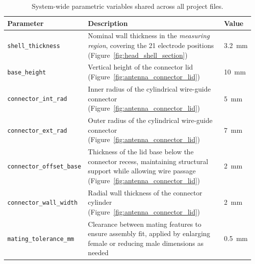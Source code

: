 \begin{table}[h!]
  \centering
  \caption[System-wide CAD parameters]{System-wide parametric variables shared across all project files.}
  \label{tab:system_params}
  \small
  \begin{tabularx}{\textwidth}{l X l}
    \toprule
    \textbf{Parameter} & \textbf{Description} & \textbf{Value} \\
    \midrule
    \texttt{shell\_thickness} & Nominal wall thickness in the \textit{measuring region}, covering the 21 electrode positions (Figure~\ref{fig:head_shell_section}) & 3.2~mm \\[2pt]
    \texttt{base\_height} & Vertical height of the connector lid (Figure~\ref{fig:antenna_connector_lid}) & 10~mm \\[2pt]
    \texttt{connector\_int\_rad} & Inner radius of the cylindrical wire-guide connector (Figure~\ref{fig:antenna_connector_lid}) & 5~mm \\[2pt]
    \texttt{connector\_ext\_rad} & Outer radius of the cylindrical wire-guide connector (Figure~\ref{fig:antenna_connector_lid}) & 7~mm \\[2pt]
    \texttt{connector\_offset\_base} & Thickness of the lid base below the connector recess, maintaining structural support while allowing wire passage (Figure~\ref{fig:antenna_connector_lid}) & 2~mm \\[2pt]
    \texttt{connector\_wall\_width} & Radial wall thickness of the connector cylinder (Figure~\ref{fig:antenna_connector_lid}) & 2~mm \\[2pt]
    \texttt{mating\_tolerance\_mm} & Clearance between mating features to ensure assembly fit, applied by enlarging female or reducing male dimensions as needed & 0.5~mm \\[2pt] 
    \bottomrule
  \end{tabularx}
\end{table}

